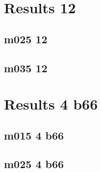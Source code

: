 \documentclass[pdftex,letterpaper,10pt]{article}
\begin{document}


\clearpage \section{Results 12}

\subsection{m025 12}



\clearpage \subsection{m035 12}



\clearpage \section{Results 4 b66}

\subsection{m015 4 b66}



\clearpage \subsection{m025 4 b66}




\clearpage
\end{document}
